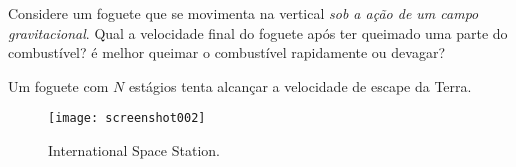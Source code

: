 \documentclass[]{IMTexam}
\begin{document}
\begin{questions}

	\medskip

	\question Considere um foguete que se movimenta na vertical \textit{sob a ação de um campo gravitacional}. Qual a velocidade final do foguete após ter queimado uma parte do combustível? é melhor queimar o combustível rapidamente ou devagar?

	\begin{solution}

	\end{solution}

	\medskip

	\question Um foguete com $ N $ estágios tenta alcançar a velocidade de escape da Terra.

	\begin{figure}
		\centering
		\texttt{[image: screenshot002]}
		\caption{International Space Station.}
		\label{fig:fig2}
	\end{figure}


\end{questions}
\end{document}
